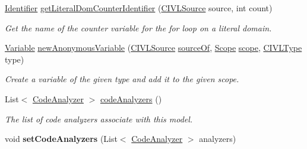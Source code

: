 \begin{DoxyCompactItemize}
\item 
\hyperlink{interfaceedu_1_1udel_1_1cis_1_1vsl_1_1civl_1_1model_1_1IF_1_1Identifier}{Identifier} \hyperlink{interfaceedu_1_1udel_1_1cis_1_1vsl_1_1civl_1_1model_1_1IF_1_1ModelFactory_a36864737814509208834f05fb67ecfcb}{get\+Literal\+Dom\+Counter\+Identifier} (\hyperlink{interfaceedu_1_1udel_1_1cis_1_1vsl_1_1civl_1_1model_1_1IF_1_1CIVLSource}{C\+I\+V\+L\+Source} source, int count)
\begin{DoxyCompactList}\small\item\em Get the name of the counter variable for the for loop on a literal domain. \end{DoxyCompactList}\item 
\hyperlink{interfaceedu_1_1udel_1_1cis_1_1vsl_1_1civl_1_1model_1_1IF_1_1variable_1_1Variable}{Variable} \hyperlink{interfaceedu_1_1udel_1_1cis_1_1vsl_1_1civl_1_1model_1_1IF_1_1ModelFactory_a277db77d8ec24abbf17266141e68cb0e}{new\+Anonymous\+Variable} (\hyperlink{interfaceedu_1_1udel_1_1cis_1_1vsl_1_1civl_1_1model_1_1IF_1_1CIVLSource}{C\+I\+V\+L\+Source} \hyperlink{interfaceedu_1_1udel_1_1cis_1_1vsl_1_1civl_1_1model_1_1IF_1_1ModelFactory_a560445f5ed48add351aa4b2f120f0c8e}{source\+Of}, \hyperlink{interfaceedu_1_1udel_1_1cis_1_1vsl_1_1civl_1_1model_1_1IF_1_1Scope}{Scope} \hyperlink{interfaceedu_1_1udel_1_1cis_1_1vsl_1_1civl_1_1model_1_1IF_1_1ModelFactory_a0bfba3ee664b183215381de7084509db}{scope}, \hyperlink{interfaceedu_1_1udel_1_1cis_1_1vsl_1_1civl_1_1model_1_1IF_1_1type_1_1CIVLType}{C\+I\+V\+L\+Type} type)
\begin{DoxyCompactList}\small\item\em Create a variable of the given type and add it to the given scope. \end{DoxyCompactList}\item 
List$<$ \hyperlink{interfaceedu_1_1udel_1_1cis_1_1vsl_1_1civl_1_1analysis_1_1IF_1_1CodeAnalyzer}{Code\+Analyzer} $>$ \hyperlink{interfaceedu_1_1udel_1_1cis_1_1vsl_1_1civl_1_1model_1_1IF_1_1ModelFactory_adfbab25974bbcdeaab76f0ff2ee91b0a}{code\+Analyzers} ()
\begin{DoxyCompactList}\small\item\em The list of code analyzers associate with this model. \end{DoxyCompactList}\item 
\hypertarget{interfaceedu_1_1udel_1_1cis_1_1vsl_1_1civl_1_1model_1_1IF_1_1ModelFactory_a36cd694c3dd3ded23e87e75e0f66c7af}{}void {\bfseries set\+Code\+Analyzers} (List$<$ \hyperlink{interfaceedu_1_1udel_1_1cis_1_1vsl_1_1civl_1_1analysis_1_1IF_1_1CodeAnalyzer}{Code\+Analyzer} $>$ analyzers)\label{interfaceedu_1_1udel_1_1cis_1_1vsl_1_1civl_1_1model_1_1IF_1_1ModelFactory_a36cd694c3dd3ded23e87e75e0f66c7af}


\end{DoxyCompactItemize}
